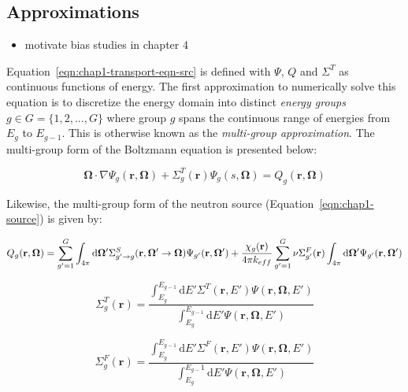 \subsection{Approximations}
\label{subsec:chap2-approx}

\begin{itemize}
  \item motivate bias studies in chapter 4
\end{itemize}

Equation~\ref{eqn:chap1-transport-eqn-src} is defined with $\Psi$, $Q$ and $\Sigma^T$ as continuous functions of energy. The first approximation to numerically solve this equation is to discretize the energy domain into distinct \textit{energy groups} $g \in G = \{1, 2, ..., G\}$ where group $g$ spans the continuous range of energies from $E_{g}$ to $E_{g-1}$. This is otherwise known as the \textit{multi-group approximation}. The multi-group form of the Boltzmann equation is presented below:

\begin{equation}
\label{eqn:chap2-transport-eqn-mg}
\mathbf{\Omega} \cdot \nabla \Psi_g(\mathbf{r},\mathbf{\mathbf{\Omega}}) + \Sigma^T_{g}(\mathbf{r})\Psi_g(s,\mathbf{\Omega}) = Q_g(\mathbf{r},\mathbf{\Omega})
\end{equation}

Likewise, the multi-group form of the neutron source (Equation~\ref{eqn:chap1-source}) is given by:

\begin{dmath}
\label{eqn:chap2-source-mg}
Q_g(\mathbf{r},\mathbf{\Omega}) = \displaystyle\sum\limits_{g'=1}^G \int_{4\pi} \mathrm{d}\mathbf{\Omega'}\Sigma_{g'\rightarrow g}^S(\mathbf{r},{\mathbf{\Omega'}\rightarrow\mathbf{\Omega}}) \Psi_{g'}(\mathbf{r},\mathbf{\Omega'}) + \\ \frac{\chi_{g}(\mathbf{r})}{4\pi k_{eff}} \displaystyle\sum\limits_{g'=1}^G \nu\Sigma_{g'}^F(\mathbf{r}) \int_{4\pi} \mathrm{d}\mathbf{\Omega'} \Psi_{g'}(\mathbf{r},\mathbf{\Omega'})
\end{dmath}

\begin{equation}
\label{eqn:moc-theory-condensed-total-xs}
\Sigma_{g}^T(\mathbf{r}) = \frac{\int_{E_{g}}^{E_{g-1}}\mathrm{d}E'\Sigma^T(\mathbf{r},E')\Psi(\mathbf{r},\mathbf{\Omega},E')}{\int_{E_{g}}^{E_{g-1}}\mathrm{d}E'\Psi(\mathbf{r},\mathbf{\Omega},E')}
\end{equation}

\begin{equation}
\label{eqn:moc-theory-condensed-fission-xs}
\Sigma_{g}^F(\mathbf{r}) = \frac{\int_{E_{g}}^{E_{g-1}}\mathrm{d}E'\Sigma^F(\mathbf{r},E')\Psi(\mathbf{r},\mathbf{\Omega},E')}{\int_{E_{g}}^{E_{g-}1}\mathrm{d}E'\Psi(\mathbf{r},\mathbf{\Omega},E')}
\end{equation}

